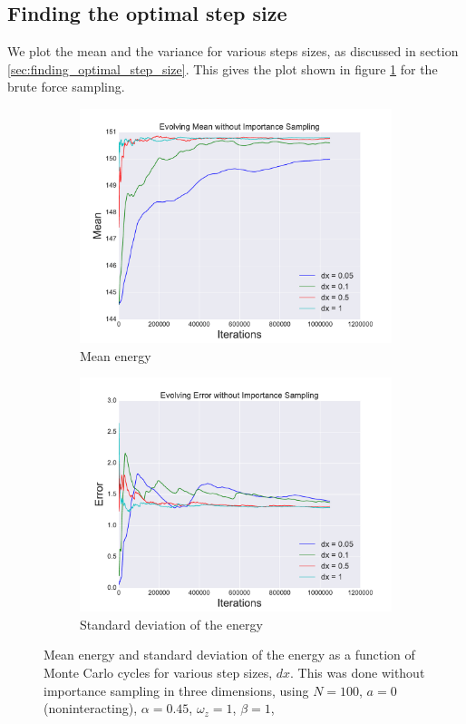 \documentclass[a4paper, 10pt]{article}
\begin{document}
	\subsection{Finding the optimal step size}
We plot the mean and the variance for various steps sizes, as discussed in section \ref{sec:finding_optimal_step_size}. This gives the plot shown in figure \ref{fig:find_dx_noimportance} for the brute force sampling.
	\begin{figure}[ht!]
		\centering
			\centering
			\begin{subfigure}{.5\textwidth}
				\centering
				\includegraphics[width=.8\linewidth]{../Results/EvoMean.pdf}
				\caption{Mean energy}
			\end{subfigure}%
			\begin{subfigure}{.5\textwidth}
				\centering
				\includegraphics[width=.8\linewidth]{../Results/EvoStd.pdf}
				\caption{Standard deviation of the energy}
			\end{subfigure}
			\caption{Mean energy and standard deviation of the energy as a function of Monte Carlo cycles for various step sizes, $dx$. This was done without importance sampling in three dimensions, using $N=100$, $a=0$ (noninteracting), $\alpha=0.45$, $\omega_z=1$, $\beta=1$,}\label{fig:find_dx_noimportance}
	\end{figure}
\end{document}
